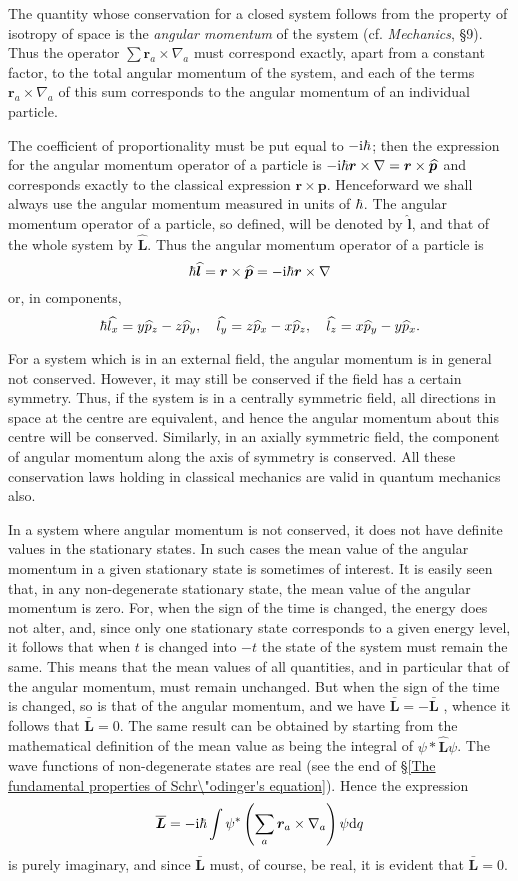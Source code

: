 The quantity whose conservation for a closed system follows from the property of isotropy of space is the \textit{angular momentum} of the system (cf. \textit{Mechanics}, \S9). Thus the operator $ \sum\bm{r}_a\times\nabla_a $ must correspond exactly, apart from a constant factor, to the total angular momentum of the system, and each of the terms $ \bm{r}_a\times\nabla_a $ of this sum corresponds to the angular momentum of an individual particle.

The coefficient of proportionality must be put equal to $ -\mathrm{i}\hbar $; then the expression for the angular momentum operator of a particle is $ -\mathrm{i}\hbar\bm{r}\times\nabla=\bm{r}\times\widehat{\bm{p}} $ and corresponds exactly to the classical expression $ \bm{r}\times\bm{p} $. Henceforward we shall always use the angular momentum measured in units of $ \hbar $. The angular momentum operator of a particle, so defined, will be denoted by $ \hat{\bm{l}} $, and that of the whole system by $ \hat{\bm{L}} $. Thus the angular momentum operator of a particle is
\begin{equation}\label{26.2}
\hbar\widehat{\bm{l}}=\bm{r}\times\widehat{\bm{p}}=-\mathrm{i}\hbar\bm{r}\times\nabla
\end{equation}
or, in components,
\[ \hbar \widehat{l_x}=y\widehat{p}_z-z\widehat{p}_y,\quad\widehat{l_y}=z\widehat{p}_x-x\widehat{p}_z,\quad\widehat{l_z}=x\widehat{p}_y-y\widehat{p}_x. \]


For a system which is in an external field, the angular momentum is in general not conserved. However, it may still be conserved if the field has a certain symmetry. Thus, if the system is in a centrally symmetric field, all directions in space at the centre are equivalent, and hence the angular momentum about this centre will be conserved. Similarly, in an axially symmetric field, the component of angular momentum along the axis of symmetry is conserved. All these conservation laws holding in classical mechanics are valid in quantum mechanics also.

In a system where angular momentum is not conserved, it does not have definite values in the stationary states. In such cases the mean value of the angular momentum in a given stationary state is sometimes of interest. It is easily seen that, in any non-degenerate stationary state, the mean value of the angular momentum is zero. For, when the sign of the time is changed, the energy does not alter, and, since only one stationary state corresponds to a given energy level, it follows that when $ t $ is changed into $ -t $ the state of the system must remain the same. This means that the mean values of all quantities, and in particular that of the angular momentum, must remain unchanged. But when the sign of the time is changed, so is that of the angular momentum, and we have $ \bar{\bm{L}}=-\bar{\bm{L}} $ , whence it follows that $ \bar{\bm{L}}=0 $. The same result can be obtained by starting from the mathematical definition of the mean value as being the integral of $\psi*\hat{\bm{L}}\psi$. The wave functions of non-degenerate states are real (see the end of \S\ref{The fundamental properties of Schr\"odinger's equation}). Hence the expression
\[ \overline{\bm{L}}=-\mathrm{i}\hbar\int\psi^*\left(\sum_{a}\bm{r}_a\times\nabla_a \right)\psi\mathrm{d} q \]
is purely imaginary, and since $ \bar{\bm{L}} $ must, of course, be real, it is evident that $ \bar{\bm{L}}=0 $.

